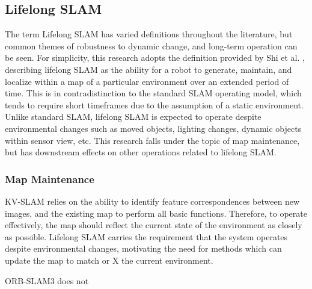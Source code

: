 \subsection{Lifelong SLAM}

The term Lifelong SLAM has varied definitions throughout the literature, but common themes of robustness to dynamic change, and long-term operation can be seen. For simplicity, this research adopts the definition provided by Shi et al. \cite{shiAreWeReady2020}, describing lifelong SLAM as the ability for a robot to generate, maintain, and localize within a map of a particular environment over an extended period of time. This is in contradistinction to the standard SLAM operating model, which tends to require short timeframes due to the assumption of a static environment. Unlike standard SLAM, lifelong SLAM is expected to operate despite environmental changes such as moved objects, lighting changes, dynamic objects within sensor view, etc. This research falls under the topic of map maintenance, but has downstream effects on other operations related to lifelong SLAM.

\subsubsection{Map Maintenance}

KV-SLAM relies on the ability to identify feature correspondences between new images, and the existing map to perform all basic functions. Therefore, to operate effectively, the map should reflect the current state of the environment as closely as possible. Lifelong SLAM carries the requirement that the system operates despite environmental changes, motivating the need for methods which can update the map to match or X the current environment.

ORB-SLAM3 does not 